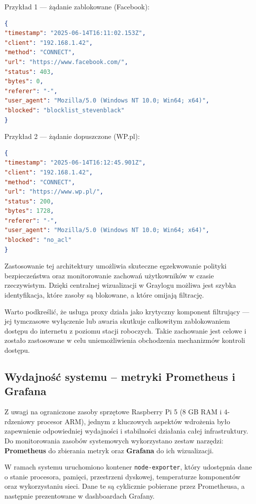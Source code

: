 \documentclass[
    left=2.5cm,         %
    right=2.5cm,        %
    top=2.5cm,          %
    bottom=3cm,         %
    bindingoffset=6mm,  %
    nohyphenation=true %
]{eiti/eiti-thesis} %
\begin{document}
Przykład 1 — żądanie zablokowane (Facebook):
\begin{lstlisting}[language=json, caption={Zablokowane żądanie HTTPS do Facebooka – dopasowane do reguły}, label={lst:squid-facebook-block}]
{
"timestamp": "2025-06-14T16:11:02.153Z",
"client": "192.168.1.42",
"method": "CONNECT",
"url": "https://www.facebook.com/",
"status": 403,
"bytes": 0,
"referer": "-",
"user_agent": "Mozilla/5.0 (Windows NT 10.0; Win64; x64)",
"blocked": "blocklist_stevenblack"
}
\end{lstlisting}

\newpage
Przykład 2 — żądanie dopuszczone (WP.pl):
\begin{lstlisting}[language=json, caption={Dostępne żądanie do portalu informacyjnego \texttt{wp.pl} – brak dopasowania do ACL}, label={lst:squid-wp-noacl}]
{
"timestamp": "2025-06-14T16:12:45.901Z",
"client": "192.168.1.42",
"method": "CONNECT",
"url": "https://www.wp.pl/",
"status": 200,
"bytes": 1728,
"referer": "-",
"user_agent": "Mozilla/5.0 (Windows NT 10.0; Win64; x64)",
"blocked": "no_acl"
}
\end{lstlisting}

Zastosowanie tej architektury umożliwia skuteczne egzekwowanie polityki bezpieczeństwa oraz monitorowanie zachowań użytkowników w czasie rzeczywistym. Dzięki centralnej wizualizacji w Graylogu możliwa jest szybka identyfikacja, które zasoby są blokowane, a które omijają filtrację.

Warto podkreślić, że usługa proxy działa jako krytyczny komponent filtrujący — jej tymczasowe wyłączenie lub awaria skutkuje całkowitym zablokowaniem dostępu do internetu z poziomu stacji roboczych. Takie zachowanie jest celowe i zostało zastosowane w celu uniemożliwienia obchodzenia mechanizmów kontroli dostępu.

\subsection{Wydajność systemu – metryki Prometheus i Grafana}

Z uwagi na ograniczone zasoby sprzętowe Raspberry Pi 5 (8 GB RAM i 4-rdzeniowy procesor ARM), jednym z kluczowych aspektów wdrożenia było zapewnienie odpowiedniej wydajności i stabilności działania całej infrastruktury. Do monitorowania zasobów systemowych wykorzystano zestaw narzędzi: \textbf{Prometheus} do zbierania metryk oraz \textbf{Grafana} do ich wizualizacji.

W ramach systemu uruchomiono kontener \texttt{node-exporter}, który udostępnia dane o stanie procesora, pamięci, przestrzeni dyskowej, temperaturze komponentów oraz wykorzystaniu sieci. Dane te są cyklicznie pobierane przez Prometheusa, a następnie prezentowane w dashboardach Grafany.
\end{document}
